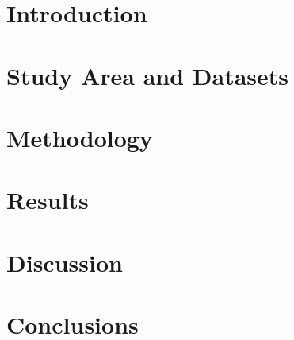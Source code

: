 \documentclass[12pt,oneside]{article}
\newcommand{\placeholder}[1]{\begingroup\sethlcolor{yellow}\hl{[#1]}\endgroup}
\begin{document}
\tableofcontents
\listoffigures
\listoftables

\clearpage

\setcounter{page}{1}
\linenumbers

\section{Introduction}
\label{sec:introduction}


\section{Study Area and Datasets}
\label{sec:study_data}



\section{Methodology}
\label{sec:methodology}


\section{Results}
\label{sec:results}


\section{Discussion}
\label{sec:discussion}


\section{Conclusions}
\label{sec:conclusions}


%
%
%

\clearpage
\appendix



\end{document}
